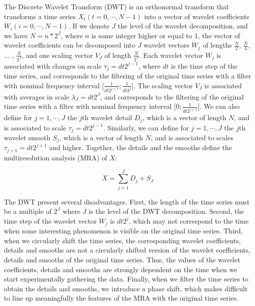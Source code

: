 \documentclass[draft]{agujournal2018}
\begin{document}
The Discrete Wavelet Transform (DWT) is an orthonormal transform that transforms a time series $X_t \left( t = 0, \cdots , N - 1 \right)$ into a vector of wavelet coefficients $W_i \left( i = 0 , \cdots , N - 1 \right)$. If we denote $J$ the level of the wavelet decomposition, and we have $N = n * 2^J$, where $n$ is some integer higher or equal to 1, the vector of wavelet coefficients can be decomposed into $J$ wavelet vectors $W_j$ of lengths $\frac{N}{2}$, $\frac{N}{4}$, ... , $\frac{N}{2^J}$, and one scaling vector $V_J$ of length $\frac{N}{2^J}$. Each wavelet vector $W_j$ is associated with changes on scale $\tau_j = dt 2^{j - 1}$, where $dt$ is the time step of the time series, and corresponds to the filtering of the original time series with a filter with nominal frequency interval $\lbrack \frac{1}{dt 2^{j + 1}} ; \frac{1}{dt 2^j} \rbrack$. The scaling vector $V_J$ is associated with averages in scale $\lambda_J = dt 2^J$, and corresponds to the filtering of the original time series with a filter with nominal frequency interval $\lbrack 0 ; \frac{1}{dt 2^{j + 1}} \rbrack$. We can also define for $j = 1 , \cdots , J$ the $j$th wavelet detail $D_j$, which is a vector of length $N$, and is associated to scale $\tau_j = dt 2^{j - 1}$. Similarly, we can define for $j = 1 , \cdots , J$ the $j$th wavelet smooth $S_j$, which is a vector of length $N$, and is associated to scales $\tau_{j + 1} = dt 2^{j + 1}$ and higher. Together, the details and the smooths define the multiresolution analysis (MRA) of $X$:

\begin{linenomath*}
\begin{equation}
X = \sum_{j = 1}^{J} D_j + S_J
\end{equation}
\end{linenomath*}

The DWT present several disadvantages. First, the length of the time series must be a multiple of $2^J$ where $J$ is the level of the DWT decomposition. Second, the time step of the wavelet vector $W_j$ is $dt 2^j$, which may not correspond to the time when some interesting phenomenon is visible on the original time series. Third, when we circularly shift the time series, the corresponding wavelet coefficients, details and smooths are not a circularly shifted version of the wavelet coefficients, details and smooths of the original time series. Thus, the values of the wavelet coefficients, details and smooths are strongly dependent on the time when we start experimentally gathering the data. Finally, when we filter the time series to obtain the details and smooths, we introduce a phase shift, which makes difficult to line up meaningfully the features of the MRA with the original time series. \\
\end{document}
